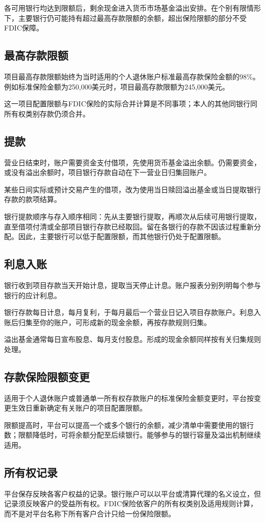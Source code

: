 \documentclass[UTF8,fontset=none,11pt,a4paper]{ctexart}
\begin{document}
各可用银行均达到限额后，剩余现金进入货币市场基金溢出安排。在个别有限情形下，主要银行仍可能持有超过最高存款限额的余额，超出保险限额的部分不受FDIC保障。


\subsection*{最高存款限额}
项目最高存款限额始终为当时适用的个人退休账户标准最高存款保险金额的98\%。例如标准保险金额为250,000美元时，项目最高存款限额为245,000美元。


这一项目配置限额与FDIC保险的实际合并计算是不同事项；本人的其他同银行同所有权类别存款仍须合并。


\subsection*{提款}
营业日结束时，账户需要资金支付借项，先使用货币基金溢出余额。仍需要资金，或没有溢出余额时，项目银行存款自动在下一营业日归集回账户。


某些日间实际或预计交易产生的借项，改为使用当日赎回溢出基金或当日提取银行存款的款项结算。


银行提款顺序与存入顺序相同：先从主要银行提取，再顺次从后续可用银行提取，直至借项付清或全部项目银行存款已经取回。留在各银行的存款不因该过程重新分配。因此，主要银行可以低于配置限额，而其他银行仍处于配置限额。


\subsection*{利息入账}
银行收到项目存款当天开始计息，提取当天停止计息。账户报表分别列明每个参与银行的应计利息。


银行存款每日计息，每月复利，于每月最后一个营业日记入项目存款账户。利息入账后归集至你的账户，可形成新的现金余额，再按存款规则归集。


溢出基金通常每日宣布股息、每月支付股息。形成的现金余额同样按有关归集规则处理。


\subsection*{存款保险限额变更}
适用于个人退休账户或普通单一所有权存款账户的标准保险金额变更时，平台按变更生效日重新确定有关账户的项目配置限额。


限额提高时，平台可以提高一个或多个银行的余额，减少清单中需要使用的银行数；限额降低时，可将余额分配至后续银行。能够参与的银行容量及溢出机制继续适用。


\subsection*{所有权记录}
平台保存反映各客户权益的记录。银行账户可以以平台或清算代理的名义设立，但记录须反映客户的受益所有权。FDIC保险依客户的所有权类别及适用规则计算，而不是对平台名称下所有客户合计只给一份保险限额。
\end{document}
